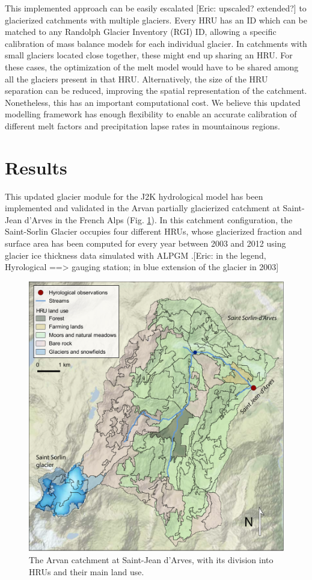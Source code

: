 This implemented approach can be easily escalated [Eric: upscaled? extended?] to glacierized catchments with multiple glaciers. Every HRU has an ID which can be matched to any Randolph Glacier Inventory (RGI) ID, allowing a specific calibration of mass balance models for each individual glacier. In catchments with small glaciers located close together, these might end up sharing an HRU. For these cases, the optimization of the melt model would have to be shared among all the glaciers present in that HRU. Alternatively, the size of the HRU separation can be reduced, improving the spatial representation of the catchment. Nonetheless, this has an important computational cost. We believe this updated modelling framework has enough flexibility to enable an accurate calibration of different melt factors and precipitation lapse rates in mountainous regions. 

\section{Results}

This updated glacier module for the J2K hydrological model has been implemented and validated in the Arvan partially glacierized catchment at Saint-Jean d'Arves in the French Alps (Fig. \ref{hydro:fig2}). In this catchment configuration, the Saint-Sorlin Glacier occupies four different HRUs, whose glacierized fraction and surface area has been computed for every year between 2003 and 2012 using glacier ice thickness data simulated with ALPGM \citep{bolibar_alpgm_2020}.[Eric: in the legend, Hyrological ==> gauging station; in blue extension of the glacier in 2003]

\begin{figure}[h]
\centering
\includegraphics[width=12cm]{Figures/hydro/Figure_2.pdf}
\caption{The Arvan catchment at Saint-Jean d'Arves, with its division into HRUs and their main land use. } 
\label{hydro:fig2}
\end{figure}


